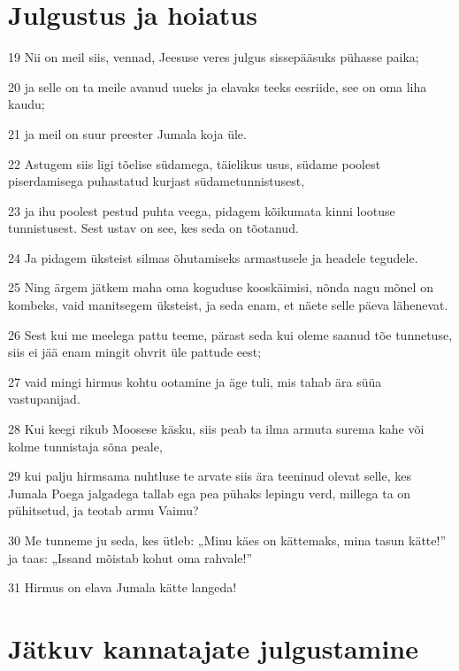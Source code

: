\section*{Julgustus ja hoiatus}

\par 19 Nii on meil siis, vennad, Jeesuse veres julgus sissepääsuks pühasse paika;
\par 20 ja selle on ta meile avanud uueks ja elavaks teeks eesriide, see on oma liha kaudu;
\par 21 ja meil on suur preester Jumala koja üle.
\par 22 Astugem siis ligi tõelise südamega, täielikus usus, südame poolest piserdamisega puhastatud kurjast südametunnistusest,
\par 23 ja ihu poolest pestud puhta veega, pidagem kõikumata kinni lootuse tunnistusest. Sest ustav on see, kes seda on tõotanud.
\par 24 Ja pidagem üksteist silmas õhutamiseks armastusele ja headele tegudele.
\par 25 Ning ärgem jätkem maha oma koguduse kooskäimisi, nõnda nagu mõnel on kombeks, vaid manitsegem üksteist, ja seda enam, et näete selle päeva lähenevat.
\par 26 Sest kui me meelega pattu teeme, pärast seda kui oleme saanud tõe tunnetuse, siis ei jää enam mingit ohvrit üle pattude eest;
\par 27 vaid mingi hirmus kohtu ootamine ja äge tuli, mis tahab ära süüa vastupanijad.
\par 28 Kui keegi rikub Moosese käsku, siis peab ta ilma armuta surema kahe või kolme tunnistaja sõna peale,
\par 29 kui palju hirmsama nuhtluse te arvate siis ära teeninud olevat selle, kes Jumala Poega jalgadega tallab ega pea pühaks lepingu verd, millega ta on pühitsetud, ja teotab armu Vaimu?
\par 30 Me tunneme ju seda, kes ütleb: „Minu käes on kättemaks, mina tasun kätte!” ja taas: „Issand mõistab kohut oma rahvale!”
\par 31 Hirmus on elava Jumala kätte langeda!

\section*{Jätkuv kannatajate julgustamine}

